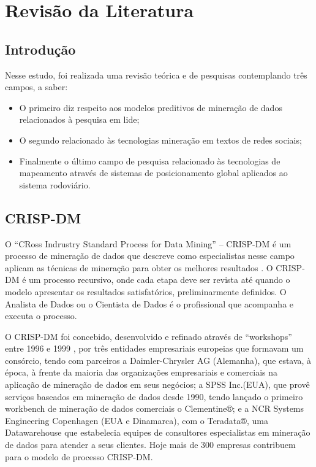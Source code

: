 \chapter{Revisão da Literatura}\label{arte}


\section{Introdução}\label{arte:intro}

Nesse estudo, foi realizada uma revisão teórica e de pesquisas contemplando três campos, a saber: 
  \begin{itemize}
    \item O primeiro diz respeito aos modelos preditivos de mineração de dados relacionados à pesquisa em lide;
    \item O segundo relacionado às tecnologias mineração em textos de redes sociais;
    \item Finalmente o último campo de pesquisa relacionado às tecnologias de mapeamento através de sistemas de posicionamento global 
    aplicados ao sistema rodoviário.
  \end{itemize}


  
\section{CRISP-DM}

O ``CRoss Indrustry Standard Process for Data Mining'' -- CRISP-DM é um processo de mineração de dados que descreve como especialistas 
nesse campo aplicam as técnicas de mineração para obter os melhores resultados \cite{Crisp2000}.
O CRISP-DM é um processo recursivo, onde cada etapa deve ser revista até quando o modelo apresentar os resultados satisfatórios, preliminarmente definidos.
O Analista de Dados ou o Cientista de Dados é o profissional que acompanha e executa o processo.

O CRISP-DM foi concebido, desenvolvido e refinado através de ``workshops'' entre 1996 e 1999 \cite{Crisp2000}, por três entidades empresariais europeias que 
formavam um consórcio, tendo com parceiros a Daimler-Chrysler AG (Alemanha), que estava, à época, à frente da maioria das organizações empresariais e comerciais 
na aplicação de mineração de dados em seus negócios; 
a SPSS Inc.(EUA), que provê serviços baseados em mineração de dados desde 1990, tendo lançado o primeiro workbench de mineração 
de dados comerciais o Clementine®; 
e a NCR Systems Engineering Copenhagen (EUA e Dinamarca), com o Teradata®, uma Datawarehouse que estabelecia equipes de consultores especialistas em mineração 
de dados para atender a seus clientes. Hoje mais de 300 empresas contribuem para o modelo de processo CRISP-DM.

